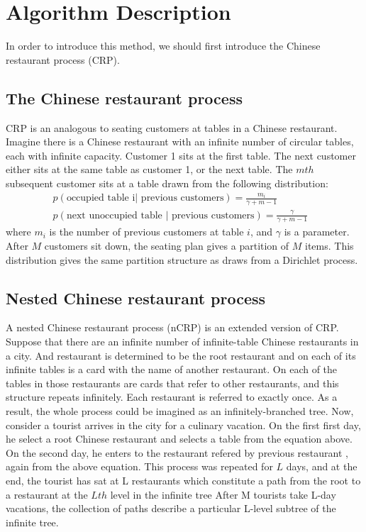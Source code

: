 \documentclass[a4paper]{article}
\begin{document}
\section{Algorithm Description}
In order to introduce this method, we should first introduce the Chinese restaurant process (CRP). 
\subsection{The Chinese restaurant process}

CRP is an analogous to seating customers at tables in a Chinese restaurant. Imagine there is a Chinese restaurant with an infinite number of circular tables, each with infinite capacity. Customer 1 sits at the first table. The next customer either sits at the same table as customer 1, or the next table.  The $mth$ subsequent customer sits at a table drawn from the following
distribution: 
\begin{align}
p(\text{occupied table i| previous customers}) =  \frac{m_i}{\gamma+m-1}  \\ 
p(\text{next unoccupied table | previous customers}) = \frac{\gamma}{\gamma + m -1} &
\end{align}
where $m_i$ is the number of previous customers at table $i$, and $\gamma$ is a parameter. After $M$
customers sit down, the seating plan gives a partition of $M$ items. This distribution gives
the same partition structure as draws from a Dirichlet process.

\subsection{Nested Chinese restaurant process}

A nested Chinese restaurant process (nCRP) is an extended version of CRP. Suppose that there are an infinite number of infinite-table Chinese restaurants in a city. And restaurant is determined to be the root restaurant and on each of its infinite tables is a card
with the name of another restaurant. On each of the tables in those restaurants are cards that
refer to other restaurants, and this structure repeats infinitely. Each restaurant is referred to
exactly once. As a result, the whole process could be imagined as an infinitely-branched tree. Now, consider 
a tourist arrives in the city for a culinary vacation. On the first first day, he select a root
Chinese restaurant and selects a table from the equation above. On the second day, he enters to the
restaurant refered by previous restaurant , again from the above equation.
This process was repeated for $L$ days, and at the end, the tourist has sat at L restaurants
which constitute a path from the root to a restaurant at the $Lth$ level in the infinite tree
After M tourists take L-day vacations, the collection of paths describe a
particular L-level subtree of the infinite tree.
\end{document}
